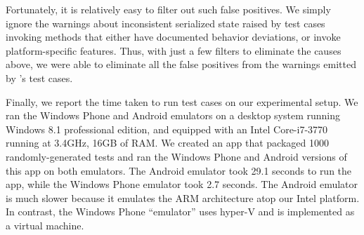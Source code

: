 Fortunately, it is relatively easy to filter out such false positives. We
simply ignore the warnings about inconsistent serialized state raised by test
cases invoking methods that either have documented behavior deviations, or
invoke platform-specific features. Thus, with just a few filters to eliminate
the causes above, we were able to eliminate all the false positives from the
warnings emitted by \tool's test cases.

%
Finally, we report the time taken to run test cases on our experimental setup.
We ran the Windows Phone and Android emulators on a desktop system running
Windows 8.1 professional edition, and equipped with an Intel Core-i7-3770
running at 3.4GHz, 16GB of RAM. We created an app that packaged 1000
randomly-generated tests and ran the Windows Phone and Android versions of this
app on both emulators. The Android emulator took 29.1 seconds to run the app,
while the Windows Phone emulator took 2.7 seconds. The Android emulator is much
slower because it emulates the ARM architecture atop our Intel platform. In
contrast, the Windows Phone ``emulator'' uses hyper-V and is implemented as a
virtual machine.
